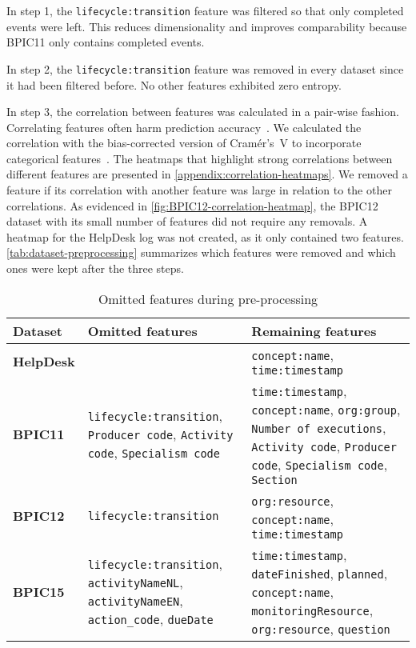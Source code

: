 In step 1, the \verb=lifecycle:transition= feature was filtered so that only completed events were left. This reduces dimensionality and improves comparability because BPIC11 only contains completed events.

In step 2, the \verb=lifecycle:transition= feature was removed in every dataset since it had been filtered before. No other features exhibited zero entropy.

In step 3, the correlation between features was calculated in a pair-wise fashion.
Correlating features often harm prediction accuracy~\cite{kuhn2013applied}.
We calculated the correlation with the bias-corrected version of Cramér's~V to incorporate categorical features~\cite{bergsma2013bias}.
The heatmaps that highlight strong correlations between different features are presented in \autoref{appendix:correlation-heatmaps}.
We removed a feature if its correlation with another feature was large in relation to the other correlations.
As evidenced in \autoref{fig:BPIC12-correlation-heatmap}, the BPIC12 dataset with its small number of features did not require any removals.
A heatmap for the HelpDesk log was not created, as it only contained two features.
\autoref{tab:dataset-preprocessing} summarizes which features were removed and which ones were kept after the three steps.

\begin{table}[!htb]
\centering
\begin{adjustbox}{center}
\begin{tabular}{lp{6cm}p{6cm}}
\textbf{Dataset} & \textbf{Omitted features} & \textbf{Remaining features}\\
\midrule
\midrule
\textbf{HelpDesk} &  & \verb=concept:name=, \verb=time:timestamp=\\
\hline
\textbf{BPIC11} & \verb=lifecycle:transition=, \verb=Producer code=,  \verb=Activity code=,  \verb=Specialism code= & \verb=time:timestamp=, \verb=concept:name=, \verb=org:group=, \verb=Number of executions=, \verb=Activity code=, \verb=Producer code=, \verb=Specialism code=, \verb=Section=\\
\hline
\textbf{BPIC12} & \verb=lifecycle:transition= & \verb=org:resource=, \verb=concept:name=, \verb=time:timestamp=\\
\hline
\textbf{BPIC15} & \verb=lifecycle:transition=, \verb=activityNameNL=, \verb=activityNameEN=, \verb=action_code=, \verb=dueDate= & \verb=time:timestamp=, \verb=dateFinished=, \verb=planned=, \verb=concept:name=, \verb=monitoringResource=, \verb=org:resource=,     \verb=question=
\end{tabular}
\end{adjustbox}
\caption{Omitted features during pre-processing}
\label{tab:dataset-preprocessing}
\end{table}

